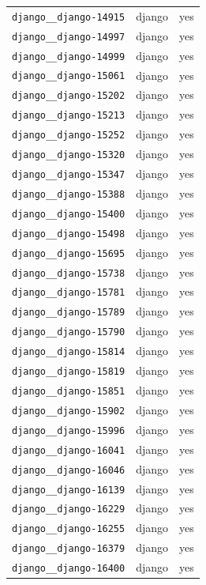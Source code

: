 \begin{longtable}{@{}p{}lp{}@{}}
\texttt{django\_\_django-14915} & django & yes \\
\texttt{django\_\_django-14997} & django & yes \\
\texttt{django\_\_django-14999} & django & yes \\
\texttt{django\_\_django-15061} & django & yes \\
\texttt{django\_\_django-15202} & django & yes \\
\texttt{django\_\_django-15213} & django & yes \\
\texttt{django\_\_django-15252} & django & yes \\
\texttt{django\_\_django-15320} & django & yes \\
\texttt{django\_\_django-15347} & django & yes \\
\texttt{django\_\_django-15388} & django & yes \\
\texttt{django\_\_django-15400} & django & yes \\
\texttt{django\_\_django-15498} & django & yes \\
\texttt{django\_\_django-15695} & django & yes \\
\texttt{django\_\_django-15738} & django & yes \\
\texttt{django\_\_django-15781} & django & yes \\
\texttt{django\_\_django-15789} & django & yes \\
\texttt{django\_\_django-15790} & django & yes \\
\texttt{django\_\_django-15814} & django & yes \\
\texttt{django\_\_django-15819} & django & yes \\
\texttt{django\_\_django-15851} & django & yes \\
\texttt{django\_\_django-15902} & django & yes \\
\texttt{django\_\_django-15996} & django & yes \\
\texttt{django\_\_django-16041} & django & yes \\
\texttt{django\_\_django-16046} & django & yes \\
\texttt{django\_\_django-16139} & django & yes \\
\texttt{django\_\_django-16229} & django & yes \\
\texttt{django\_\_django-16255} & django & yes \\
\texttt{django\_\_django-16379} & django & yes \\
\texttt{django\_\_django-16400} & django & yes \\

\end{longtable}
